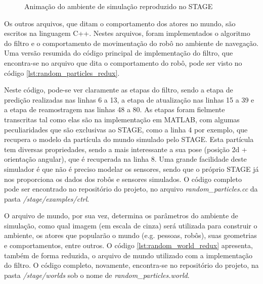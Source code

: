\documentclass[
	12pt,				%
	openright,			%
	oneside,			%
	a4paper,			%
	english,			%
	french,				%
	spanish,			%
	brazil,				%
	]{abntex2}
\begin{document}
\begin{figure}
    \centering
    \caption{Animação do ambiente de simulação reproduzido no STAGE}
    \label{fig:stage-anim}
\end{figure}

Os outros arquivos, que ditam o comportamento dos atores no mundo, são escritos na linguagem C++. Nestes arquivos, foram implementados o algoritmo do filtro e o comportamento de movimentação do robô no ambiente de navegação. Uma versão resumida do código principal de implementação do filtro, que encontra-se no arquivo que dita o comportamento do robô, pode ser visto no código \ref{lst:random_particles_redux}.



Neste código, pode-se ver claramente as etapas do filtro, sendo a etapa de predição realizadas nas linhas 6 a 13, a etapa de atualização nas linhas 15 a 39 e a etapa de reamostragem nas linhas 48 a 80. As etapas foram fielmente transcritas tal como elas são na implementação em MATLAB, com algumas peculiaridades que são exclusivas ao STAGE, como a linha 4 por exemplo, que recupera o modelo da partícula do mundo simulado pelo STAGE. Esta partícula tem diversas propriedades, sendo a mais interessante a sua pose (posição 2d + orientação angular), que é recuperada na linha 8. Uma grande facilidade deste simulador é que não é preciso modelar os sensores, sendo que o próprio STAGE já nos proporciona os dados dos robôs e sensores simulados. O código completo pode ser encontrado no repositório do projeto, no arquivo \emph{random\_particles.cc} da pasta \emph{/stage/examples/ctrl}.\par

O arquivo de mundo, por sua vez, determina os parâmetros do ambiente de simulação, como qual imagem (em escala de cinza) será utilizada para construir o ambiente, os atores que popularão o mundo (e.g. pessoas, robôs), suas geometrias e comportamentos, entre outros. O código \ref{lst:random_world_redux} apresenta, também de forma reduzida, o arquivo de mundo utilizado com a implementação do filtro. O código completo, novamente, encontra-se no repositório do projeto, na pasta \emph{/stage/worlds} sob o nome de \emph{random\_particles.world}.


\end{document}
